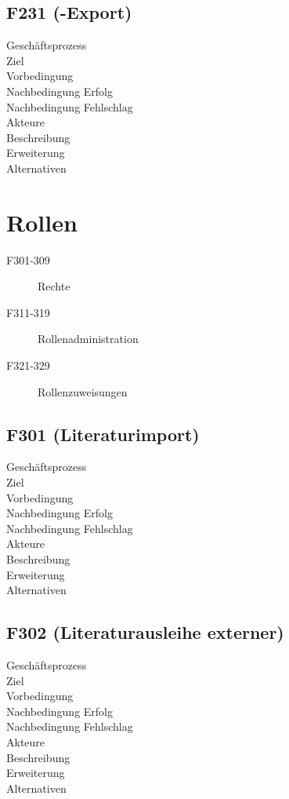 \subsection{F231 (\BibTeX -Export)}
\begin{description}
  \item[Geschäftsprozess]
  \item[Ziel]
  \item[Vorbedingung]
  \item[Nachbedingung Erfolg]
  \item[Nachbedingung Fehlschlag]
  \item[Akteure]
  \item[Beschreibung]
  \item[Erweiterung]
  \item[Alternativen]
\end{description}


\section{Rollen}
\begin{description}
  \item[F301-309]Rechte
  \item[F311-319]Rollenadministration
  \item[F321-329]Rollenzuweisungen
\end{description}

\subsection{F301 (Literaturimport)}
\begin{description}
  \item[Geschäftsprozess]
  \item[Ziel]
  \item[Vorbedingung]
  \item[Nachbedingung Erfolg]
  \item[Nachbedingung Fehlschlag]
  \item[Akteure]
  \item[Beschreibung]
  \item[Erweiterung]
  \item[Alternativen]
\end{description}

\subsection{F302 (Literaturausleihe externer)}
\begin{description}
  \item[Geschäftsprozess]
  \item[Ziel]
  \item[Vorbedingung]
  \item[Nachbedingung Erfolg]
  \item[Nachbedingung Fehlschlag]
  \item[Akteure]
  \item[Beschreibung]
  \item[Erweiterung]
  \item[Alternativen]
\end{description}


